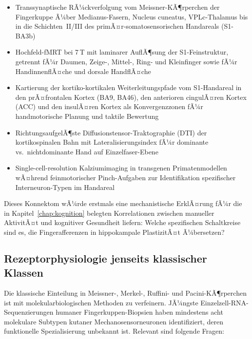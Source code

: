 ﻿\documentclass[12pt,a4paper]{report}
\theoremstyle{plain}
\theoremstyle{definition}
\theoremstyle{remark}
\begin{document}
\begin{itemize}
\item Transsynaptische RÃ¼ckverfolgung vom Meissner-KÃ¶rperchen der Fingerkuppe
  Ã¼ber Medianus-Fasern, Nucleus cuneatus, VPLc-Thalamus bis in die
  Schichten~II/III des primÃ¤r-somatosensorischen Handareals (S1-BA3b)
\item Hochfeld-fMRT bei 7\,T mit laminarer AuflÃ¶sung der S1-Feinstruktur,
  getrennt fÃ¼r Daumen, Zeige-, Mittel-, Ring- und Kleinfinger sowie
  fÃ¼r HandinnenflÃ¤che und dorsale HandflÃ¤che
\item Kartierung der kortiko-kortikalen Weiterleitungspfade vom
  S1-Handareal in den prÃ¤frontalen Kortex (BA9, BA46), den anterioren
  cingulÃ¤ren Kortex (ACC) und den insulÃ¤ren Kortex als Konvergenzzonen
  fÃ¼r handmotorische Planung und taktile Bewertung
\item RichtungsaufgelÃ¶ste Diffusionstensor-Traktographie (DTI) der
  kortikospinalen Bahn mit Lateralisierungsindex fÃ¼r dominante vs.\
  nichtdominante Hand auf Einzelfaser-Ebene
\item Single-cell-resolution Kalziumimaging in transgenen Primatenmodellen
  wÃ¤hrend feinmotorischer Pinch-Aufgaben zur Identifikation spezifischer
  Interneuron-Typen im Handareal
\end{itemize}

Dieses Konnektom wÃ¼rde erstmals eine mechanistische ErklÃ¤rung fÃ¼r die in
Kapitel~\ref{chap:kognition} belegten Korrelationen zwischen manueller
AktivitÃ¤t und kognitiver Gesundheit liefern: Welche spezifischen Schaltkreise
sind es, die Fingerafferenzen in hippokampale PlastizitÃ¤t Ã¼bersetzen?

\subsection{Rezeptorphysiologie jenseits klassischer Klassen}

Die klassische Einteilung in Meissner-, Merkel-, Ruffini- und
Pacini-KÃ¶rperchen ist mit molekularbiologischen Methoden zu verfeinern.
JÃ¼ngste Einzelzell-RNA-Sequenzierungen humaner Fingerkuppen-Biopsien
haben mindestens acht molekulare Subtypen kutaner Mechanosensorneuronen
identifiziert, deren funktionelle Spezialisierung unbekannt ist.
Relevant sind folgende Fragen:
\end{document}

